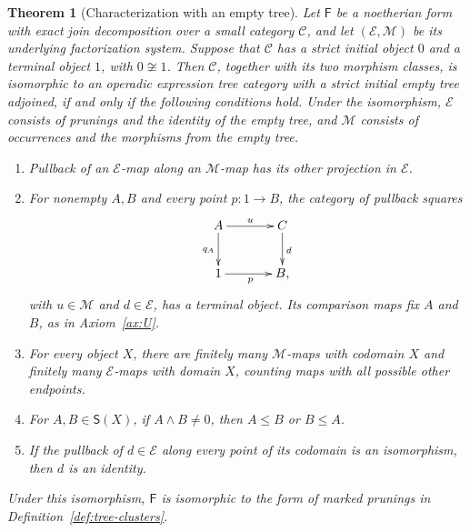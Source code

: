 \documentclass[11pt,a4paper]{article}
\theoremstyle{plain}
\newtheorem{theorem}{Theorem}[section]
\theoremstyle{definition}
\theoremstyle{remark}
\begin{document}
\begin{theorem}[Characterization with an empty tree]
\label{thm:ejd-tree-characterization}
Let $\mathsf F$ be a noetherian form with exact join decomposition
over a small category $\mathcal C$, and let
$(\mathcal E,\mathcal M)$ be its underlying factorization system.
Suppose that $\mathcal C$ has a strict initial object $0$ and a
terminal object $1$, with $0\not\cong1$.
Then $\mathcal C$, together with its two morphism classes, is
isomorphic to an operadic expression tree category with a strict
initial empty tree adjoined, if and only if the following conditions
hold. Under the isomorphism, $\mathcal E$ consists of prunings
and the identity of the empty tree, and $\mathcal M$ consists
of occurrences and the morphisms from the empty tree.
\begin{enumerate}
\item Pullback of an $\mathcal E$-map along an $\mathcal M$-map
has its other projection in $\mathcal E$.
\item For nonempty $A,B$ and every point $p:1\to B$, the
category of pullback squares
\[
\xymatrix@C=3.5em@R=2.4em{
A\ar[r]^u\ar[d]_{q_A}&C\ar[d]^d\\
1\ar[r]_p&B,
}
\]
with $u\in\mathcal M$ and $d\in\mathcal E$, has a terminal
object. Its comparison maps fix $A$ and $B$, as in
Axiom~\ref{ax:U}.
\item For every object $X$, there are finitely many
$\mathcal M$-maps with codomain $X$ and finitely many
$\mathcal E$-maps with domain $X$, counting maps with all
possible other endpoints.
\item For $A,B\in\mathsf S(X)$, if $A\wedge B\ne0$, then
$A\le B$ or $B\le A$.
\item If the pullback of $d\in\mathcal E$ along every point
of its codomain is an isomorphism, then $d$ is an identity.
\end{enumerate}
Under this isomorphism, $\mathsf F$ is isomorphic to the form of
marked prunings in Definition~\ref{def:tree-clusters}.
\end{theorem}
\end{document}
